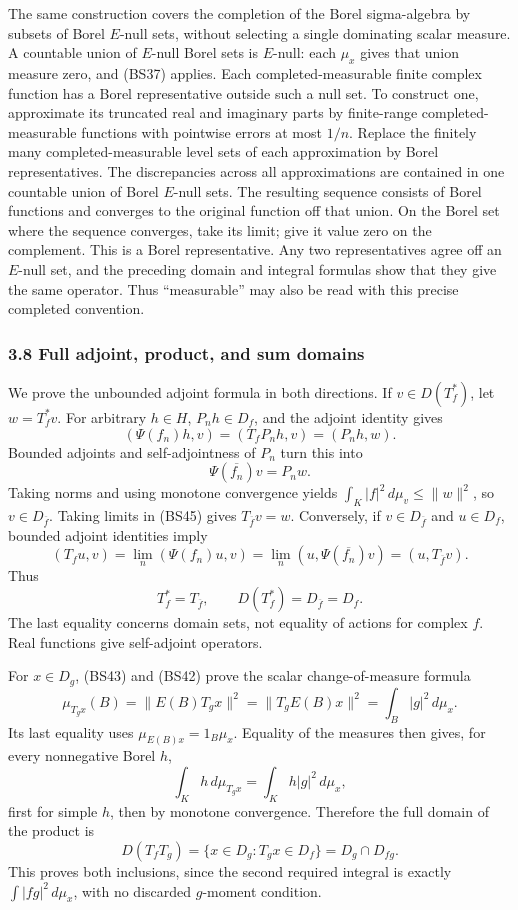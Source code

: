 \documentclass[
  11pt,
]{article}
\begin{document}
The same construction covers the completion of the Borel sigma-algebra
by subsets of Borel \(E\)-null sets, without selecting a single
dominating scalar measure. A countable union of \(E\)-null Borel sets is
\(E\)-null: each \(\mu_x\) gives that union measure zero, and (BS37)
applies. Each completed-measurable finite complex function has a Borel
representative outside such a null set. To construct one, approximate
its truncated real and imaginary parts by finite-range
completed-measurable functions with pointwise errors at most \(1/n\).
Replace the finitely many completed-measurable level sets of each
approximation by Borel representatives. The discrepancies across all
approximations are contained in one countable union of Borel \(E\)-null
sets. The resulting sequence consists of Borel functions and converges
to the original function off that union. On the Borel set where the
sequence converges, take its limit; give it value zero on the
complement. This is a Borel representative. Any two representatives
agree off an \(E\)-null set, and the preceding domain and integral
formulas show that they give the same operator. Thus ``measurable'' may
also be read with this precise completed convention.

\subsubsection{3.8 Full adjoint, product, and sum
domains}\label{full-adjoint-product-and-sum-domains}

We prove the unbounded adjoint formula in both directions. If
\(v\in D(T_f^*)\), let \(w=T_f^*v\). For arbitrary \(h\in H\),
\(P_nh\in D_f\), and the adjoint identity gives \[
 (\Psi(f_n)h,v)=(T_fP_nh,v)=(P_nh,w).
\] Bounded adjoints and self-adjointness of \(P_n\) turn this into \[
 \Psi(\overline{f_n})v=P_nw.
 \tag{BS45}
\] Taking norms and using monotone convergence yields
\(\int_K|f|^2\,d\mu_v\leq\|w\|^2\), so \(v\in D_{\overline f}\). Taking
limits in (BS45) gives \(T_{\overline f}v=w\). Conversely, if
\(v\in D_{\overline f}\) and \(u\in D_f\), bounded adjoint identities
imply \[
 (T_fu,v)=\lim_n(\Psi(f_n)u,v)
 =\lim_n(u,\Psi(\overline{f_n})v)
 =(u,T_{\overline f}v).
\] Thus \[
 T_f^*=T_{\overline f},\qquad
 D(T_f^*)=D_{\overline f}=D_f.
 \tag{BS46}
\] The last equality concerns domain sets, not equality of actions for
complex \(f\). Real functions give self-adjoint operators.

For \(x\in D_g\), (BS43) and (BS42) prove the scalar change-of-measure
formula \[
 \mu_{T_gx}(B)=\|E(B)T_gx\|^2
             =\|T_gE(B)x\|^2
             =\int_B|g|^2\,d\mu_x.
 \tag{BS47}
\] Its last equality uses \(\mu_{E(B)x}=1_B\mu_x\). Equality of the
measures then gives, for every nonnegative Borel \(h\), \[
 \int_Kh\,d\mu_{T_gx}=\int_Kh|g|^2\,d\mu_x,
 \tag{BS48}
\] first for simple \(h\), then by monotone convergence. Therefore the
full domain of the product is \[
 D(T_fT_g)
 =\{x\in D_g:T_gx\in D_f\}
 =D_g\cap D_{fg}.
 \tag{BS49}
\] This proves both inclusions, since the second required integral is
exactly \(\int|fg|^2\,d\mu_x\), with no discarded \(g\)-moment
condition.
\end{document}
